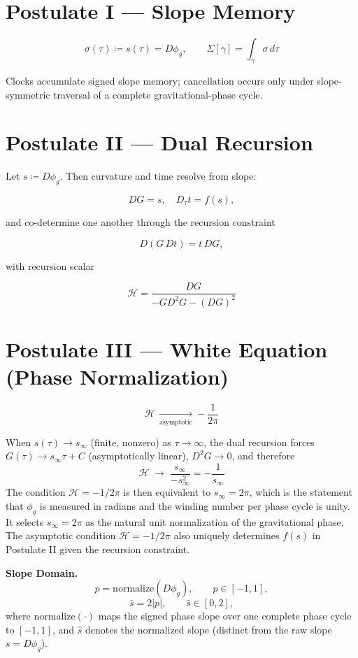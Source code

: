 \documentclass[12pt]{article}
\begin{document}
\section*{Postulate I — Slope Memory}

\[
\sigma(\tau) \coloneqq s(\tau) = D\phi_g,
\qquad
\Sigma[\gamma] = \int_\gamma \sigma \, d\tau
\]

\noindent
Clocks accumulate signed slope memory; cancellation occurs only under slope-symmetric traversal of a complete gravitational-phase cycle.

\vspace{0.4em}
\section*{Postulate II — Dual Recursion}

Let $s \coloneqq D\phi_g$. Then curvature and time resolve from slope:

\[
DG = s,\quad D_\tau t = f(s),
\]

\newpage

and co-determine one another through the recursion constraint

\[
D(G\,Dt) = t\,DG,
\]

with recursion scalar

\[
\mathcal{H} = \frac{DG}{-G D^2 G - (DG)^2}
\]

\vspace{0.8em}
\section*{Postulate III — White Equation (Phase Normalization)}

\[
\mathcal{H}\,\xrightarrow[\text{asymptotic}]{} -\frac{1}{2\pi}
\]

\noindent
When $s(\tau) \to s_\infty$ (finite, nonzero) as $\tau\to\infty$, the dual recursion 
forces $G(\tau) \to s_\infty\tau + C$ (asymptotically linear), $D^2G \to 0$, and therefore
\[
\mathcal{H} \;\longrightarrow\; \frac{s_\infty}{-s_\infty^2} = -\frac{1}{s_\infty}
\]
The condition $\mathcal{H} = -1/2\pi$ is then equivalent to $s_\infty = 2\pi$, which is 
the statement that $\phi_g$ is measured in radians and the winding number per phase cycle 
is unity. It selects $s_\infty = 2\pi$ as the natural unit normalization of the 
gravitational phase. The asymptotic condition $\mathcal{H} = -1/2\pi$ also uniquely 
determines $f(s)$ in Postulate II given the recursion constraint.

\vspace{0.8em}
\noindent\textbf{Slope Domain.}
\begin{equation*}
p = \mathrm{normalize}(D\phi_g), \qquad p \in [-1,1],
\end{equation*}
\begin{equation*}
\hat{s} = 2|p|, \qquad \hat{s} \in [0,2],
\end{equation*}
{where $\mathrm{normalize}(\cdot)$ maps the signed phase slope over one complete phase cycle to $[-1,1]$, and $\hat{s}$ denotes the normalized slope (distinct from the raw slope $s = D\phi_g$).}
\end{document}
